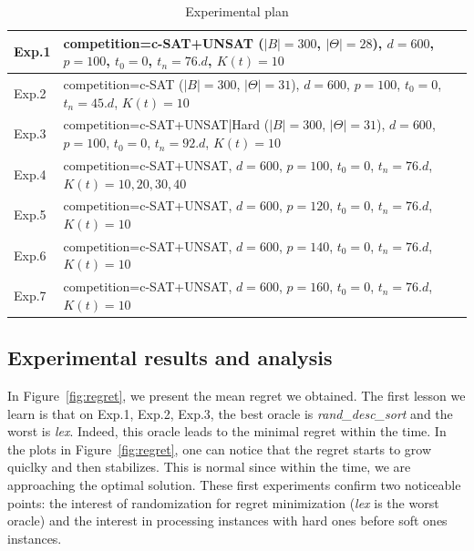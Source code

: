 \documentclass[10pt, conference, compsocconf]{IEEEtran}
\begin{document}
\begin{table}
  \begin{center}
  \begin{tabular}{ p{1cm} | p{6cm} }

    {\small Exp.1} & {\small competition=c-SAT+UNSAT ($|B| = 300$, $|\Theta| = 28$), $d=600$, $p=100$, $t_0 = 0$, $t_n = 76.d$, $K(t) = 10$} \\\hline
    {\small Exp.2} & {\small competition=c-SAT ($|B| = 300$, $|\Theta| = 31$), $d=600$, $p=100$, $t_0 = 0$, $t_n = 45.d$, $K(t) = 10$} \\\hline
    {\small Exp.3} & {\small competition=c-SAT+UNSAT|Hard ($|B| = 300$, $|\Theta| = 31$), $d=600$, $p=100$, $t_0 = 0$, $t_n = 92.d$, $K(t) = 10$} \\\hline
    {\small Exp.4} & {\small competition=c-SAT+UNSAT, $d=600$, $p=100$, $t_0 = 0$, $t_n = 76.d$, $K(t) = 10, 20, 30, 40$} \\\hline
    {\small Exp.5} & {\small competition=c-SAT+UNSAT, $d=600$, $p=120$, $t_0 = 0$, $t_n = 76.d$, $K(t) = 10$} \\\hline
    {\small Exp.6} & {\small competition=c-SAT+UNSAT, $d=600$, $p=140$, $t_0 = 0$, $t_n = 76.d$, $K(t) = 10$} \\\hline
    {\small Exp.7} & {\small competition=c-SAT+UNSAT, $d=600$, $p=160$, $t_0 = 0$, $t_n = 76.d$, $K(t) = 10$} \\
  \end{tabular}
  \caption{Experimental plan}
  \label{tab:plan}
  \end{center} 
\end{table}




\subsection{Experimental results and analysis}

In Figure~\ref{fig:regret}, we present the mean regret we obtained. The first lesson we learn is that 
on {\small Exp.1, Exp.2, Exp.3}, the best oracle is {\it rand\_desc\_sort}  and the worst is {\it lex}. 
Indeed, this oracle leads to the minimal regret within the time. In the plots in Figure~\ref{fig:regret}, 
one can notice that the regret starts to grow quiclky and then stabilizes. This is normal since within 
the time, we are approaching the optimal solution. 
These first experiments confirm two noticeable points: the interest of randomization 
for regret minimization ({\it lex} is the worst oracle) and the interest in processing instances with hard ones 
before soft ones instances. 
\end{document}
